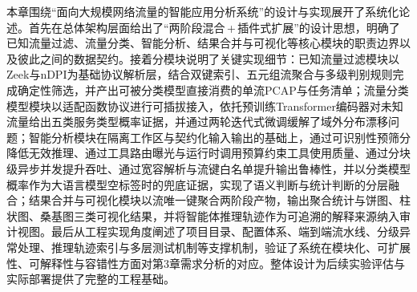 本章围绕“面向大规模网络流量的智能应用分析系统”的设计与实现展开了系统化论述。首先在总体架构层面给出了“两阶段混合\,+\,插件式扩展”的设计思想，明确了已知流量过滤、流量分类、智能分析、结果合并与可视化等核心模块的职责边界以及彼此之间的数据契约。接着分模块说明了关键实现细节：已知流量过滤模块以Zeek与nDPI为基础协议解析层，结合双键索引、五元组流聚合与多级判别规则完成确定性筛选，并产出可被分类模型直接消费的单流PCAP与任务清单；流量分类模型模块以适配函数协议进行可插拔接入，依托预训练Transformer编码器对未知流量给出五类服务类型概率证据，并通过两轮迭代式微调缓解了域外分布漂移问题；智能分析模块在隔离工作区与契约化输入输出的基础上，通过可识别性预筛分降低无效推理、通过工具路由曝光与运行时调用预算约束工具使用质量、通过分块级异步并发提升吞吐、通过宽容解析与流键白名单提升输出鲁棒性，并以分类模型概率作为大语言模型空标签时的兜底证据，实现了语义判断与统计判断的分层融合；结果合并与可视化模块以流唯一键聚合两阶段产物，输出聚合统计与饼图、柱状图、桑基图三类可视化结果，并将智能体推理轨迹作为可追溯的解释来源纳入审计视图。最后从工程实现角度阐述了项目目录、配置体系、端到端流水线、分级异常处理、推理轨迹索引与多层测试机制等支撑机制，验证了系统在模块化、可扩展性、可解释性与容错性方面对第3章需求分析的对应。整体设计为后续实验评估与实际部署提供了完整的工程基础。
